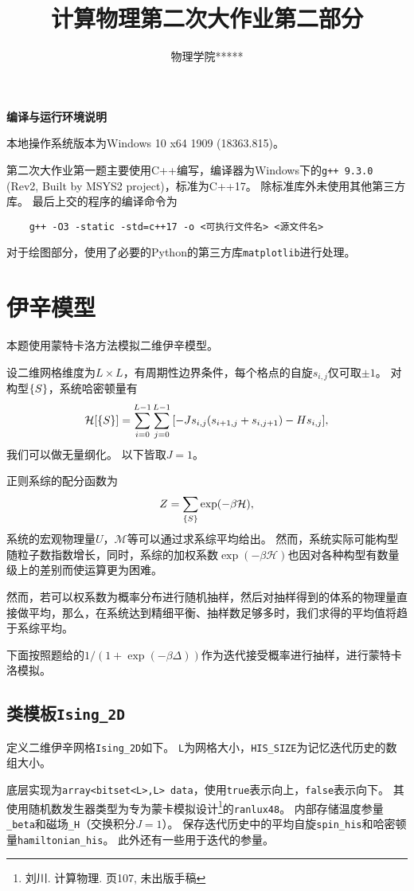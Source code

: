 \documentclass[a4paper,unicode]{report}
\title{计算物理第二次大作业第二部分}
\author{物理学院\quad ***\quad 1800011***}
\begin{document}
\maketitle
\tableofcontents

\begin{center}
    \textbf{编译与运行环境说明}
\end{center}

本地操作系统版本为\textsf{Windows 10 x64 1909 (18363.815)}。

第二次大作业第一题主要使用\textsf{C++}编写，编译器为Windows下的\texttt{g++ 9.3.0} (Rev2, Built by MSYS2 project)，标准为\textsf{C++17}。
除标准库外未使用其他第三方库。
最后上交的程序的编译命令为\begin{verbatim}
    g++ -O3 -static -std=c++17 -o <可执行文件名> <源文件名>
\end{verbatim}

对于绘图部分，使用了必要的\textsf{Python}的第三方库\texttt{matplotlib}进行处理。

\setcounter{chapter}{1}
\chapter{伊辛模型}
本题使用蒙特卡洛方法模拟二维伊辛模型。

设二维网格维度为$L\times L$，有周期性边界条件，每个格点的自旋$s_{i, j}$仅可取$\pm 1$。
对构型$\qty{S}$，系统哈密顿量有
\begin{equation}
    \mathcal{H}\qty[\qty{S}] = \sum_{i=0}^{L-1} \sum_{j=0}^{L-1} \qty[-Js_{i,j}(s_{i+1,j}+s_{i,j+1}) - Hs_{i,j}],
\end{equation}
我们可以做无量纲化。
以下皆取$J=1$。

正则系综的配分函数为
\begin{eqnarray}
    Z = \sum_\qty{S}\exp(-\beta \mathcal{H}),
\end{eqnarray}
系统的宏观物理量$U$，$\mathcal{M}$等可以通过求系综平均给出。
然而，系统实际可能构型随粒子数指数增长，同时，系综的加权系数$\exp(-\beta \mathcal{H})$也因对各种构型有数量级上的差别而使运算更为困难。

然而，若可以权系数为概率分布进行随机抽样，然后对抽样得到的体系的物理量直接做平均，那么，在系统达到精细平衡、抽样数足够多时，我们求得的平均值将趋于系综平均。

下面按照题给的$1/(1+\exp(-\beta\Delta))$作为迭代接受概率进行抽样，进行蒙特卡洛模拟。

\section*{类模板\texttt{Ising\_2D}}
定义二维伊辛网格\verb|Ising_2D|如下。
\verb|L|为网格大小，\verb|HIS_SIZE|为记忆迭代历史的数组大小。
{
    \linespread{1.0}
    
}
底层实现为\texttt{array<bitset<L>,L> data}，使用\verb|true|表示向上，\verb|false|表示向下。
其使用随机数发生器类型为专为蒙卡模拟设计\footnote{刘川. 计算物理. 页107, 未出版手稿}的\texttt{ranlux48}。
内部存储温度参量\verb|_beta|和磁场\verb|_H|（交换积分$J=1$）。
保存迭代历史中的平均自旋\verb|spin_his|和哈密顿量\verb|hamiltonian_his|。
此外还有一些用于迭代的参量。
\end{document}

